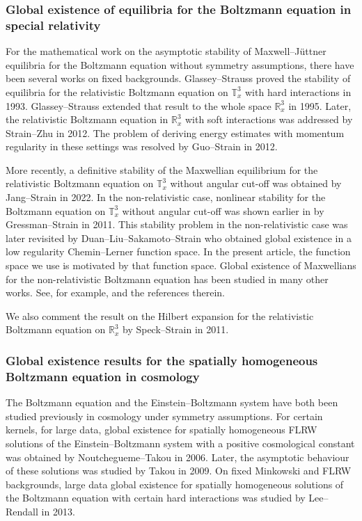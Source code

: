 \documentclass[reqno]{amsart}
\def\R{\mathbb R}
\newcommand{\T}{\mathbb{T}}
\theoremstyle{definition}
\numberwithin{equation}{section}
\numberwithin{theorem}{section}
\begin{document}
\subsubsection{Global existence of equilibria for the Boltzmann equation in special relativity}


For the mathematical work on the asymptotic stability of Maxwell--J\"uttner equilibria for the Boltzmann equation without symmetry assumptions, there have been several works on fixed backgrounds. Glassey--Strauss \cite{MR1211782} proved the stability of equilibria for the relativistic Boltzmann equation on \(\T^3_x\) with hard interactions in 1993. Glassey--Strauss \cite{MR1321370} extended that result to the whole space \(\R^3_x\) in 1995. Later, the relativistic Boltzmann equation in \(\R^3_x\) with soft interactions was addressed by Strain--Zhu \cite{MR2911100} in 2012. The problem of deriving energy estimates with momentum regularity in these settings was resolved by Guo--Strain \cite{MR2891870} in 2012. 


More recently, a definitive stability of the Maxwellian equilibrium for the relativistic Boltzmann equation on \(\T^3_x\) without angular cut-off was obtained by Jang--Strain \cite{RelBolNoncut2020} in 2022. In the non-relativistic case, nonlinear stability for the Boltzmann equation on \(\T^3_x\) without angular cut-off was shown earlier in  \cite{MR2784329} by Gressman--Strain in 2011. This stability problem in the non-relativistic case was later revisited by Duan--Liu--Sakamoto--Strain \cite{MR471665} who obtained global existence in a low regularity Chemin--Lerner function space. In the present article, the function space we use is motivated by that function space. Global existence of Maxwellians for the non-relativistic Boltzmann equation has been studied in many other works. See, for example, \cite{AMUXY-2011-CMP, AMUXY-2012-JFA, MR3213301, MR3532066, DSa, UY, Guo-2010} and the references therein. 

 We also comment the result on the Hilbert expansion for the relativistic Boltzmann equation on \(\R^3_x\) by Speck--Strain \cite{MR2793935} in 2011.

\subsubsection{Global existence results for the spatially homogeneous Boltzmann equation in cosmology}

The Boltzmann equation and the Einstein--Boltzmann system have both been studied previously in cosmology under symmetry assumptions. For certain kernels, for large data, global existence for spatially homogeneous FLRW solutions of the Einstein--Boltzmann system with a positive cosmological constant was obtained by Noutchegueme--Takou \cite{NoutcheguemeTakou2006} in 2006. Later, the asymptotic behaviour of these solutions was studied by Takou \cite{Takou2009} in 2009. On fixed Minkowski and FLRW backgrounds, large data global existence for spatially homogeneous solutions of the Boltzmann equation with certain hard interactions was studied by Lee--Rendall \cite{lee2013spatially} in 2013.
\end{document}
